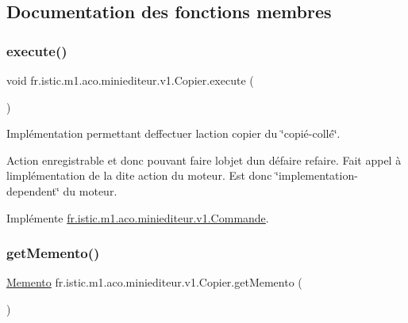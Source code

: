 \subsection{Documentation des fonctions membres}
\mbox{\label{classfr_1_1istic_1_1m1_1_1aco_1_1miniediteur_1_1v1_1_1Copier_ac0a36f63af9a9c11bdc4c043923ded58}} 
\subsubsection{\texorpdfstring{execute()}{execute()}}
{\footnotesize\ttfamily void fr.\+istic.\+m1.\+aco.\+miniediteur.\+v1.\+Copier.\+execute (\begin{DoxyParamCaption}{ }\end{DoxyParamCaption})}



Implémentation permettant d\textquotesingle{}effectuer l\textquotesingle{}action copier du \char`\"{}copié-\/collé\char`\"{}. 

Action enregistrable et donc pouvant faire l\textquotesingle{}objet d\textquotesingle{}un défaire refaire. Fait appel à l\textquotesingle{}implémentation de la dite action du moteur. Est donc \char`\"{}implementation-\/dependent\char`\"{} du moteur. 

Implémente \hyperlink{interfacefr_1_1istic_1_1m1_1_1aco_1_1miniediteur_1_1v1_1_1Commande_a87a8a55bac4e81e32339248f79f7de4f}{fr.\+istic.\+m1.\+aco.\+miniediteur.\+v1.\+Commande}.

\mbox{\label{classfr_1_1istic_1_1m1_1_1aco_1_1miniediteur_1_1v1_1_1Copier_af7810fb486b49fcf6ca28958de33c7d0}} 
\subsubsection{\texorpdfstring{get\+Memento()}{getMemento()}}
{\footnotesize\ttfamily \hyperlink{interfacefr_1_1istic_1_1m1_1_1aco_1_1miniediteur_1_1v1_1_1Memento}{Memento} fr.\+istic.\+m1.\+aco.\+miniediteur.\+v1.\+Copier.\+get\+Memento (\begin{DoxyParamCaption}{ }\end{DoxyParamCaption})}



